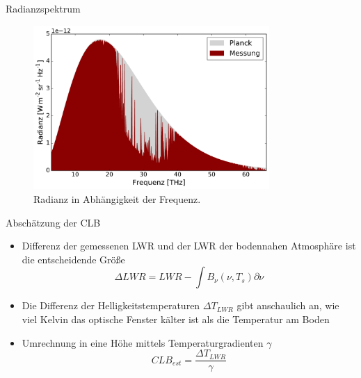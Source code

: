 \documentclass{beamer}
\begin{document}
\begin{frame}{Radianzspektrum}
\begin{figure}[ht]
    \centering
    \includegraphics[width=0.8\textwidth]{figures/midlatitude-summer_spectrum.pdf}
    \caption{Radianz in Abhängigkeit der Frequenz.}
    \label{fig:spectrum}
\end{figure}
\end{frame}

\begin{frame}{Abschätzung der CLB}
\begin{itemize}
  \vfill\item Differenz der gemessenen LWR und der LWR der bodennahen
      Atmosphäre ist die entscheidende Größe
      \[ \Delta LWR = LWR - \int B_\nu(\nu, T_s) \partial\nu \]
  \vfill\item Die Differenz der Helligkeitstemperaturen $\Delta T_{LWR}$ gibt
      anschaulich an, wie viel Kelvin das optische Fenster kälter ist als die
      Temperatur am Boden
  \vfill\item Umrechnung in eine Höhe mittels Temperaturgradienten $\gamma$
      \[ CLB_{est} = \frac{\Delta T_{LWR}}{\gamma} \]
  \vfill
\end{itemize}
\end{frame}
\end{document}
